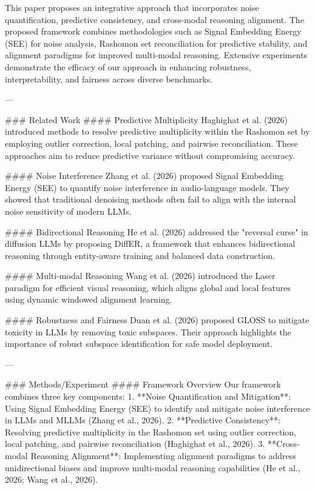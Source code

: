 This paper proposes an integrative approach that incorporates noise quantification, predictive consistency, and cross-modal reasoning alignment. The proposed framework combines methodologies such as Signal Embedding Energy (SEE) for noise analysis, Rashomon set reconciliation for predictive stability, and alignment paradigms for improved multi-modal reasoning. Extensive experiments demonstrate the efficacy of our approach in enhancing robustness, interpretability, and fairness across diverse benchmarks.

---

### Related Work
#### Predictive Multiplicity
Haghighat et al. (2026) introduced methods to resolve predictive multiplicity within the Rashomon set by employing outlier correction, local patching, and pairwise reconciliation. These approaches aim to reduce predictive variance without compromising accuracy.

#### Noise Interference
Zhang et al. (2026) proposed Signal Embedding Energy (SEE) to quantify noise interference in audio-language models. They showed that traditional denoising methods often fail to align with the internal noise sensitivity of modern LLMs.

#### Bidirectional Reasoning
He et al. (2026) addressed the "reversal curse" in diffusion LLMs by proposing DiffER, a framework that enhances bidirectional reasoning through entity-aware training and balanced data construction.

#### Multi-modal Reasoning
Wang et al. (2026) introduced the Laser paradigm for efficient visual reasoning, which aligns global and local features using dynamic windowed alignment learning.

#### Robustness and Fairness
Duan et al. (2026) proposed GLOSS to mitigate toxicity in LLMs by removing toxic subspaces. Their approach highlights the importance of robust subspace identification for safe model deployment.

---

### Methods/Experiment
#### Framework Overview
Our framework combines three key components:
1. **Noise Quantification and Mitigation**: Using Signal Embedding Energy (SEE) to identify and mitigate noise interference in LLMs and MLLMs (Zhang et al., 2026).
2. **Predictive Consistency**: Resolving predictive multiplicity in the Rashomon set using outlier correction, local patching, and pairwise reconciliation (Haghighat et al., 2026).
3. **Cross-modal Reasoning Alignment**: Implementing alignment paradigms to address unidirectional biases and improve multi-modal reasoning capabilities (He et al., 2026; Wang et al., 2026).

